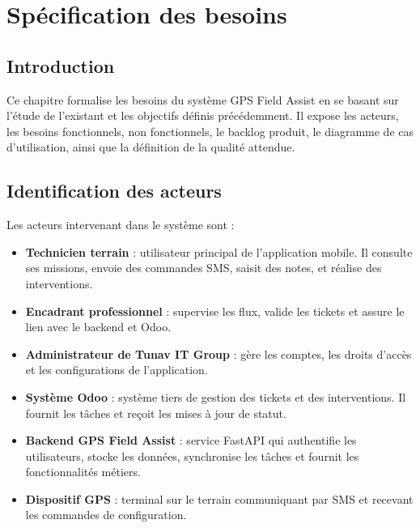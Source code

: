 \documentclass[12pt,a4paper]{report}
\begin{document}
\chapter{Spécification des besoins}
\section{Introduction}
\noindent Ce chapitre formalise les besoins du système GPS Field Assist en se basant sur l'étude de l'existant et les objectifs définis précédemment. Il expose les acteurs, les besoins fonctionnels, non fonctionnels, le backlog produit, le diagramme de cas d'utilisation, ainsi que la définition de la qualité attendue.

\section{Identification des acteurs}
\noindent Les acteurs intervenant dans le système sont :
\begin{itemize}
    \item \textbf{Technicien terrain} : utilisateur principal de l'application mobile. Il consulte ses missions, envoie des commandes SMS, saisit des notes, et réalise des interventions.
    \item \textbf{Encadrant professionnel} : supervise les flux, valide les tickets et assure le lien avec le backend et Odoo.
    \item \textbf{Administrateur de Tunav IT Group} : gère les comptes, les droits d'accès et les configurations de l'application.
    \item \textbf{Système Odoo} : système tiers de gestion des tickets et des interventions. Il fournit les tâches et reçoit les mises à jour de statut.
    \item \textbf{Backend GPS Field Assist} : service FastAPI qui authentifie les utilisateurs, stocke les données, synchronise les tâches et fournit les fonctionnalités métiers.
    \item \textbf{Dispositif GPS} : terminal sur le terrain communiquant par SMS et recevant les commandes de configuration.
\end{itemize}
\end{document}
